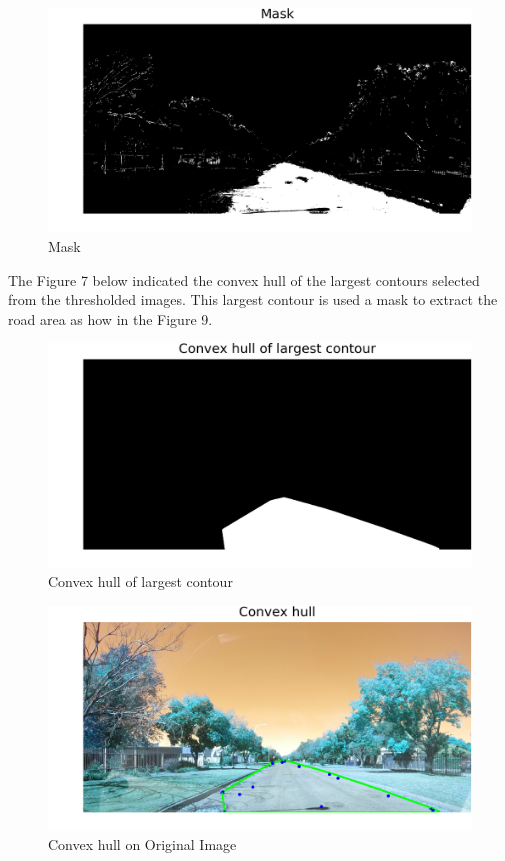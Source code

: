 \documentclass[journal]{IEEEtran}
\begin{document}
\begin{figure}[!htb]
\begin{center}
\includegraphics[scale=0.65]{Images/4_Mask.png}
\end{center}
\caption{Mask}
\end{figure}

The Figure 7 below indicated the convex hull of the largest contours selected from the thresholded images. This largest contour is used a mask to extract the road area as how in the Figure 9.

\begin{figure}[!htb]
\begin{center}
\includegraphics[scale=0.65]{Images/5_Convex_hull_of_largest_contour.png}
\end{center}
\caption{Convex hull of largest contour}
\end{figure}


\begin{figure}[!htb]
\begin{center}
\includegraphics[scale=1]{Images/6_Convex_hull.png}
\end{center}
\caption{Convex hull on Original Image}
\end{figure}
\end{document}
